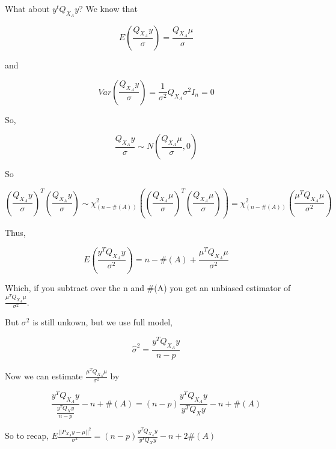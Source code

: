 \documentclass[11pt,fleqn]{book} %
\begin{document}
What about $y^t Q_{X_A} y$? We know that

$$E (\frac{Q_{X_A}y}{\sigma}) = \frac{Q_{X_A}\mu}{\sigma}$$

and

$$Var(\frac{Q_{X_A}y}{\sigma}) = \frac{1}{\sigma^2} Q_{X_A}\sigma^2 I_n = 0$$

So, 

$$ \frac{Q_{X_A}y}{\sigma} \sim N( \frac{Q_{X_A}\mu}{\sigma}, 0)$$

So

$$(\frac{Q_{X_A}y}{\sigma})^T(\frac{Q_{X_A}y}{\sigma}) \sim \chi^2_{(n-\#(A))} ((\frac{Q_{X_A}\mu}{\sigma})^T(\frac{Q_{X_A}\mu}{\sigma})) = \chi^2_{(n-\#(A))} (\frac{\mu^T Q_{X_A} \mu}{\sigma^2}) $$

Thus, 

$$E(\frac{y^T Q_{X_A} y}{\sigma^2} ) = n - \#(A) + \frac{\mu^T Q_{X_A} \mu}{\sigma^2} $$

Which, if you subtract over the n and \#(A) you get an unbiased estimator of $\frac{\mu^T Q_{X_A} \mu}{\sigma^2}$.

But $\sigma^2$ is still unkown, but we use full model, 

$$\hat{\sigma}^2 = \frac{y^T Q_{X_A} y}{n - p} $$

Now we can estimate $\frac{\mu^T Q_{X_A} \mu}{\sigma^2} $ by 

$$\frac{y^T Q_{X_A} y}{\frac{y^T Q_{X} y}{n-p}} - n + \#(A) = (n-p) \frac{y^T Q_{X_A} y}{y^T Q_{X} y} - n + \#(A)$$ 

So to recap, $ E\frac{ || P_{X_A} y - \mu ||^2}{\sigma^2} = (n-p)\frac{y^T Q_{X_A} y}{y^T Q_{X} y} - n + 2 \#(A) $










\end{document}
